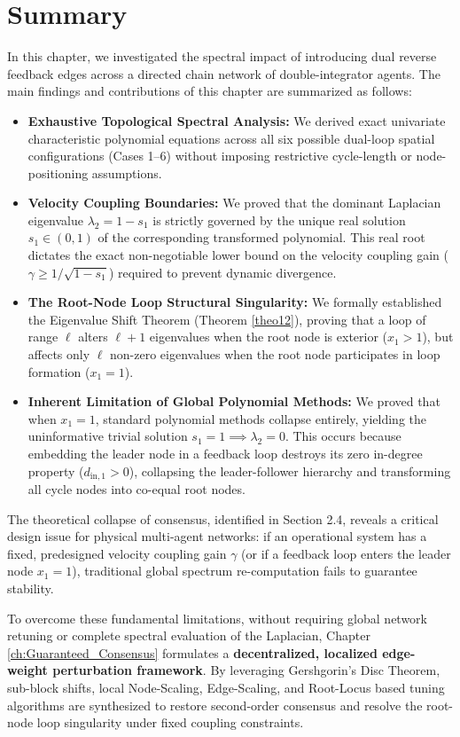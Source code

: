 \section{Summary}\label{sec:ch_TRE_Summary}
In this chapter, we investigated the spectral impact of introducing dual reverse feedback edges across a directed chain network of double-integrator agents. The main findings and contributions of this chapter are summarized as follows:
\begin{itemize}
    \item \textbf{Exhaustive Topological Spectral Analysis:} We derived exact univariate characteristic polynomial equations across all six possible dual-loop spatial configurations (Cases 1–6) without imposing restrictive cycle-length or node-positioning assumptions.
    \item \textbf{Velocity Coupling Boundaries:} We proved that the dominant Laplacian eigenvalue $\lambda_2 = 1 - s_1$ is strictly governed by the unique real solution $s_1 \in (0,1)$ of the corresponding transformed polynomial. This real root dictates the exact non-negotiable lower bound on the velocity coupling gain ($\gamma \ge 1/\sqrt{1 - s_1}$) required to prevent dynamic divergence.
    \item \textbf{The Root-Node Loop Structural Singularity:} We formally established the Eigenvalue Shift Theorem (Theorem \ref{theo12}), proving that a loop of range $\ell$ alters $\ell+1$ eigenvalues when the root node is exterior ($x_1 > 1$), but affects only $\ell$ non-zero eigenvalues when the root node participates in loop formation ($x_1 = 1$).
    \item \textbf{Inherent Limitation of Global Polynomial Methods:} We proved that when $x_1 = 1$, standard polynomial methods collapse entirely, yielding the uninformative trivial solution $s_1 = 1 \implies \lambda_2 = 0$. This occurs because embedding the leader node in a feedback loop destroys its zero in-degree property ($d_{\text{in}, 1} > 0$), collapsing the leader-follower hierarchy and transforming all cycle nodes into co-equal root nodes.
\end{itemize}

The theoretical collapse of consensus, identified in Section 2.4, reveals a critical design issue for physical multi-agent networks: if an operational system has a fixed, predesigned velocity coupling gain $\gamma$ (or if a feedback loop enters the leader node $x_1 = 1$), traditional global spectrum re-computation fails to guarantee stability. 

To overcome these fundamental limitations, without requiring global network retuning or complete spectral evaluation of the Laplacian, Chapter \ref{ch:Guaranteed_Consensus} formulates a \textbf{decentralized, localized edge-weight perturbation framework}. By leveraging Gershgorin's Disc Theorem, sub-block shifts, local Node-Scaling, Edge-Scaling, and Root-Locus based tuning algorithms are synthesized to restore second-order consensus and resolve the root-node loop singularity under fixed coupling constraints.